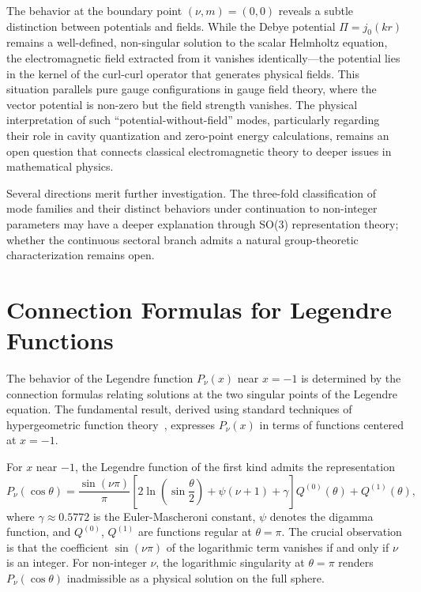 \documentclass[
  aip,
  amsmath,amssymb,
  preprint
]{revtex4-1}
\begin{document}
The behavior at the boundary point $(\nu, m) = (0, 0)$ reveals a subtle distinction between potentials and fields. While the Debye potential $\Pi = j_0(kr)$ remains a well-defined, non-singular solution to the scalar Helmholtz equation, the electromagnetic field extracted from it vanishes identically---the potential lies in the kernel of the curl-curl operator that generates physical fields. This situation parallels pure gauge configurations in gauge field theory, where the vector potential is non-zero but the field strength vanishes. The physical interpretation of such ``potential-without-field'' modes, particularly regarding their role in cavity quantization and zero-point energy calculations, remains an open question that connects classical electromagnetic theory to deeper issues in mathematical physics.

Several directions merit further investigation. The three-fold classification of mode families and their distinct behaviors under continuation to non-integer parameters may have a deeper explanation through SO(3) representation theory; whether the continuous sectoral branch admits a natural group-theoretic characterization remains open.

\newpage
\appendix
\section{Connection Formulas for Legendre Functions}
\label{app:connection_formulas}
The behavior of the Legendre function $P_\nu(x)$ near $x = -1$ is determined by the connection formulas relating solutions at the two singular points of the Legendre equation. The fundamental result, derived using standard techniques of hypergeometric function theory~\cite{WhittakerWatson1927, DLMF}, expresses $P_\nu(x)$ in terms of functions centered at $x = -1$.

For $x$ near $-1$, the Legendre function of the first kind admits the representation
\begin{equation}
P_\nu(\cos\theta) = \frac{\sin(\nu\pi)}{\pi}\left[2\ln\left(\sin\frac{\theta}{2}\right) + \psi(\nu+1) + \gamma\right]Q^{(0)}(\theta) + Q^{(1)}(\theta),
\label{eq:Pnu_connection}
\end{equation}
where $\gamma \approx 0.5772$ is the Euler-Mascheroni constant, $\psi$ denotes the digamma function, and $Q^{(0)}$, $Q^{(1)}$ are functions regular at $\theta = \pi$. The crucial observation is that the coefficient $\sin(\nu\pi)$ of the logarithmic term vanishes if and only if $\nu$ is an integer. For non-integer $\nu$, the logarithmic singularity at $\theta = \pi$ renders $P_\nu(\cos\theta)$ inadmissible as a physical solution on the full sphere.
\end{document}
